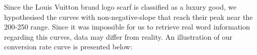 Since the Louis Vuitton brand logo scarf is classified as a luxury good, we hypothesised the curves with non-negative-slope that reach their peak near the 200-250 \EUR{} range. Since it was impossible for us to retrieve real word information regarding this curves, data may differ from reality. An illustration of our conversion rate curve is presented below:\newline
{} 
\clearpage
